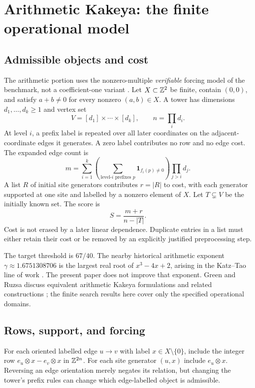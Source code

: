 \documentclass[11pt,letterpaper]{article}
\theoremstyle{definition}
\theoremstyle{remark}\newtheorem{remark}[theorem]{Remark}
\begin{document}
\section{Arithmetic Kakeya: the finite operational model}
\subsection{Admissible objects and cost}
The arithmetic portion uses the nonzero-multiple \emph{verifiable} forcing model of the benchmark, not a coefficient-one variant \cite{epochAK}. Let $X\subset\mathbb Z^2$ be finite, contain $(0,0)$, and satisfy $a+b\neq0$ for every nonzero $(a,b)\in X$. A tower has dimensions $d_1,\ldots,d_k\geq1$ and vertex set
\[
V=[d_1]\times\cdots\times[d_k],\qquad n=\prod_i d_i.
\]
At level $i$, a prefix label is repeated over all later coordinates on the adjacent-coordinate edges it generates. A zero label contributes no row and no edge cost. The expanded edge count is
\begin{equation}\label{eq:edgecost}
m=\sum_{i=1}^k\left(\sum_{\text{level-}i\text{ prefixes }p}\mathbf1_{f_i(p)\ne0}\right)\prod_{j>i}d_j.
\end{equation}
A list $R$ of initial site generators contributes $r=|R|$ to cost, with each generator supported at one site and labelled by a nonzero element of $X$. Let $T\subsetneq V$ be the initially known set. The score is
\begin{equation}\label{eq:score}
S=\frac{m+r}{n-|T|}.
\end{equation}
Cost is not erased by a later linear dependence. Duplicate entries in a list must either retain their cost or be removed by an explicitly justified preprocessing step.

The target threshold is $67/40$. The nearby historical arithmetic exponent $\gamma\approx1.6751308706$ is the largest real root of $x^3-4x+2$, arising in the Katz--Tao line of work \cite{KT,epochAK}. The present paper does not improve that exponent. Green and Ruzsa discuss equivalent arithmetic Kakeya formulations and related constructions \cite{GR}; the finite search results here cover only the specified operational domains.

\subsection{Rows, support, and forcing}
For each oriented labelled edge $u\to v$ with label $x\in X\setminus\{0\}$, include the integer row $e_u\otimes x-e_v\otimes x$ in $\mathbb Z^{2n}$. For each site generator $(u,x)$ include $e_u\otimes x$. Reversing an edge orientation merely negates its relation, but changing the tower's prefix rules can change which edge-labelled object is admissible.
\end{document}
